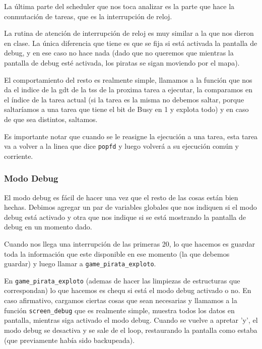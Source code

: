 La última parte del scheduler que nos toca analizar es la parte que hace la conmutación de tareas, que es la interrupción de reloj.
 
La rutina de atención de interrupción de reloj es muy similar a la que nos dieron en clase. La única diferencia que tiene es que se fija si está activada la pantalla de debug, y en ese caso no hace nada (dado que no queremos que mientras la pantalla de debug esté activada, los piratas se sigan moviendo por el mapa).
 
El comportamiento del resto es realmente simple, llamamos a la función que nos da el indice de la gdt de la tss de la proxima tarea a ejecutar, la comparamos en el índice de la tarea actual (si la tarea es la misma no debemos saltar, porque saltaríamos a una tarea que tiene el bit de Busy en 1 y explota todo) y en caso de que sea distintos, saltamos.
 
Es importante notar que cuando se le reasigne la ejecución a una tarea, esta tarea va a volver a la linea que dice \texttt{popfd} y luego volverá a su ejecución común y corriente.
 
\subsubsection*{Modo Debug}
 
El modo debug es fácil de hacer una vez que el resto de las cosas están bien hechas. Debimos agregar un par de variables globales que nos indiquen si el modo debug está activado y otra que nos indique si se está mostrando la pantalla de debug en un momento dado.
 
Cuando nos llega una interrupción de las primeras 20, lo que hacemos es guardar toda la información que este disponible en ese momento (la que debemos guardar) y luego llamar a \texttt{game_pirata_exploto}.
 
En \texttt{game_pirata_exploto} (ademas de hacer las limpiezas de estructuras que correspondan) lo que hacemos es chequ si está el modo debug activado o no. En caso afirmativo, cargamos ciertas cosas que sean necesarias y llamamos a la función \texttt{screen_debug} que es realmente simple, muestra todos los datos en pantalla, mientras siga activado el modo debug. Cuando se vuelve a apretar 'y', el modo debug se desactiva y se sale de el loop, restaurando la pantalla como estaba (que previamente había sido backupeada).
 


